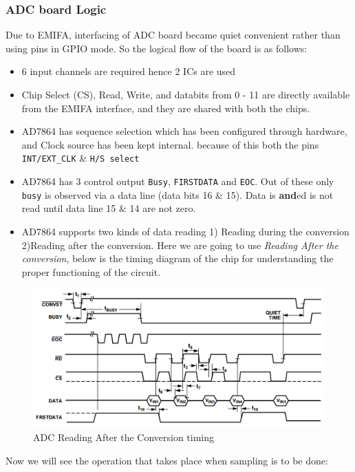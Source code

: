 \subsubsection{ADC board Logic}
Due to EMIFA, interfacing of ADC board became quiet convenient rather than using pins in GPIO mode. So the logical flow of the board is as follows:
\begin{itemize}
\item 6 input channels are required hence 2 ICs are used
\item Chip Select (CS), Read, Write, and databits from 0 - 11 are directly available from the EMIFA interface, and they are shared with both the chips.
\item AD7864 has sequence selection which has been configured through hardware, and Clock source has been kept internal. because of this both the pins \texttt{INT/EXT\_CLK} \& \texttt{H/S select}
\item AD7864 has 3 control output \texttt{Busy}, \texttt{FIRSTDATA} and \texttt{EOC}. Out of these only \texttt{busy} is observed via a data line (data bits 16 \& 15). Data is \textbf{and}ed is not read until data line 15 \& 14 are not zero.
\item AD7864 supports two kinds of data reading 1) Reading during the conversion 2)Reading after the conversion. Here we are going to use \textit{Reading After the conversion}, below is the timing diagram of the chip for understanding the proper functioning of the circuit.
\end{itemize}
\begin{figure}[h]
\includegraphics[width = \columnwidth]{fig/adc_time_diag.png}
\caption{ADC Reading After the Conversion timing }
\label{fig:adc_timing}
\end{figure}
Now we will see the operation that takes place when sampling  is to be done:
